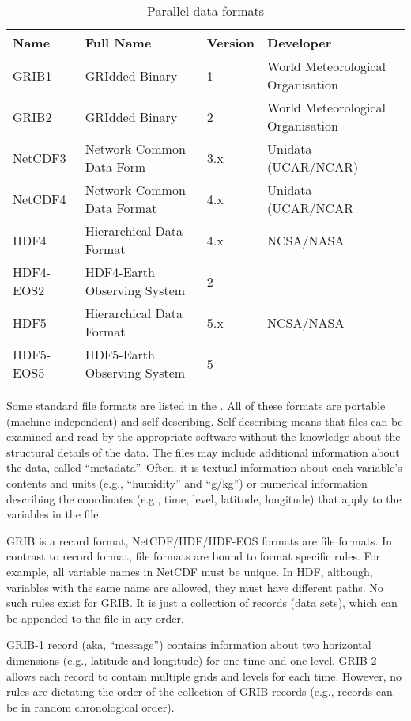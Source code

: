 \begin{table}
  \centering
  \begin{tabular}{l|l|l|l}
    Name      & Full Name                   & Version & Developer \\
    \hline
    GRIB1     & GRIdded Binary             & 1       & World Meteorological Organisation\\
    GRIB2     & GRIdded Binary             & 2       & World Meteorological Organisation\\
    NetCDF3   & Network Common Data Form   & 3.x     & Unidata (UCAR/NCAR)\\
    NetCDF4   & Network Common Data Format & 4.x     & Unidata (UCAR/NCAR\\
    HDF4      & Hierarchical Data Format   & 4.x     & NCSA/NASA\\
    HDF4-EOS2 & HDF4-Earth Observing System & 2       & \\
    HDF5      & Hierarchical Data Format   & 5.x     & NCSA/NASA\\
    HDF5-EOS5 & HDF5-Earth Observing System & 5       & \\
\end{tabular}
\caption{Parallel data formats}
\label{tab:fformats}
\end{table}


Some standard file formats are listed in the .
All of these formats are portable (machine independent) and self-describing.
Self-describing means that files can be examined and read by the appropriate software without the knowledge about the structural details of the data.
The files may include additional information about the data, called ``metadata''.
Often, it is textual information about each variable's contents and units (e.g., ``humidity'' and ``g/kg'') or numerical information describing the coordinates (e.g., time, level, latitude, longitude) that apply to the variables in the file.

GRIB is a record format, NetCDF/HDF/HDF-EOS formats are file formats.
In contrast to record format, file formats are bound to format specific rules.
For example, all variable names in NetCDF must be unique.
In HDF, although, variables with the same name are allowed, they must have different paths.
No such rules exist for GRIB.
It is just a collection of records (data sets), which can be appended to the file in any order.

GRIB-1 record (aka, ``message'') contains information about two horizontal dimensions (e.g., latitude and longitude) for one time and one level.
GRIB-2 allows each record to contain multiple grids and levels for each time.
However, no rules are dictating the order of the collection of GRIB records (e.g., records can be in random chronological order).

